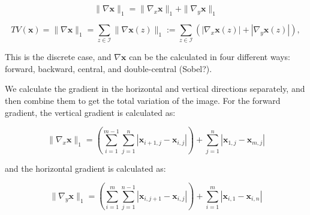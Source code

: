 \documentclass[12pt]{article}
\begin{document}


\begin{equation}
  \| \nabla \mathbf{x} \|_1 = \| \nabla_x \mathbf{x} \|_1 + \| \nabla_y \mathbf{x} \|_1
\end{equation}

\begin{equation}
  TV(\mathbf{x}) = \|\nabla \mathbf{x}\|_1 = \sum_{z \in \mathcal{I}} \|\nabla \mathbf{x}(z)\|_1 := \sum_{z \in \mathcal{I}} \left( |\nabla_x \mathbf{x}(z)| + |\nabla_y \mathbf{x}(z)| \right),
\end{equation}


This is the discrete case, and $\nabla \mathbf{x}$ can be the calculated in four different ways: forward, backward, central, and double-central (Sobel?). 

We calculate the gradient in the horizontal and vertical directions separately, and then combine them to get the total variation of the image. 
For the forward gradient, the vertical gradient is calculated as:

\begin{equation}
  \| \nabla_x \mathbf{x} \|_1 = \left( \sum_{i=1}^{m-1} \sum_{j=1}^{n} |\mathbf{x}_{i+1,j} - \mathbf{x}_{i,j}| \right) + \sum_{j=1}^{n} |\mathbf{x}_{1, j} - \mathbf{x}_{m,j}|
\end{equation}

and the horizontal gradient is calculated as:

\begin{equation}
  \| \nabla_y \mathbf{x} \|_1 = \left( \sum_{i=1}^{m} \sum_{j=1}^{n-1} |\mathbf{x}_{i,j+1} - \mathbf{x}_{i,j}| \right) + \sum_{i=1}^{m} |\mathbf{x}_{i, 1} - \mathbf{x}_{i,n}|
\end{equation}


\end{document}

